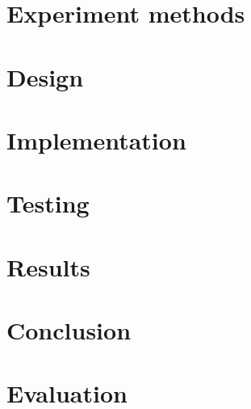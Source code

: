 \documentclass[a4paper,11pt]{article}
\begin{document}
\section{Experiment methods}

\section{Design}
\section{Implementation}
\section{Testing}
\section{Results}
\section{Conclusion}
\section{Evaluation}
\end{document}
